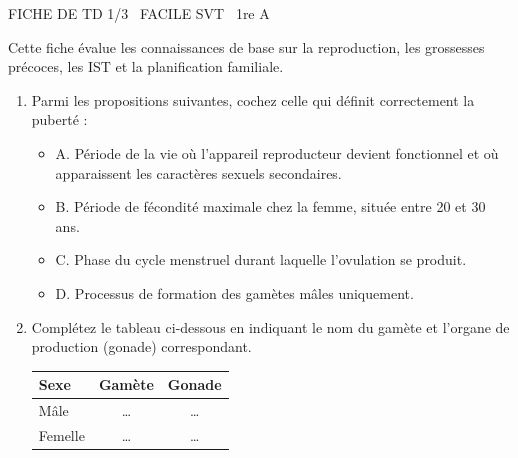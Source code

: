 \documentclass[11pt]{article}
\begin{document}
\begin{tcolorbox}[enhanced,colback=popink,colframe=popink,arc=10pt,boxrule=0pt,left=12pt,right=12pt,top=9pt,bottom=9pt]
{\color{white}\popxbold\small FICHE DE TD 1/3 \textbullet\ FACILE \hfill SVT \textbullet\ 1re A\par}
\end{tcolorbox}
\vspace{4pt}
Cette fiche évalue les connaissances de base sur la reproduction, les grossesses précoces, les IST et la planification familiale.

\begin{exercice}
\begin{enumerate}
    \item Parmi les propositions suivantes, cochez celle qui définit correctement la puberté :
    \begin{itemize}
        \item[] A. Période de la vie où l'appareil reproducteur devient fonctionnel et où apparaissent les caractères sexuels secondaires.
        \item[] B. Période de fécondité maximale chez la femme, située entre 20 et 30 ans.
        \item[] C. Phase du cycle menstruel durant laquelle l'ovulation se produit.
        \item[] D. Processus de formation des gamètes mâles uniquement.
    \end{itemize}
    \item Complétez le tableau ci-dessous en indiquant le nom du gamète et l'organe de production (gonade) correspondant.
    \begin{tabular}{|l|c|c|}
    \hline
    \textbf{Sexe} & \textbf{Gamète} & \textbf{Gonade} \\
    \hline
    Mâle & \ldots & \ldots \\
    \hline
    Femelle & \ldots & \ldots \\
    \hline
    \end{tabular}
\end{enumerate}
\end{exercice}
\end{document}

